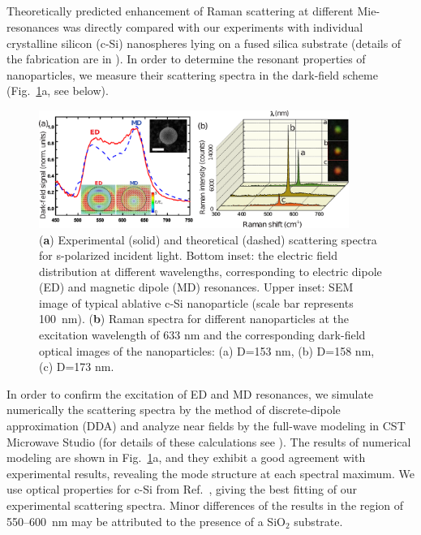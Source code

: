     \subsection{}
        \label{sec:RamanExp}
        Theoretically predicted enhancement of Raman scattering at different Mie-resonances was directly compared with our
        experiments with individual crystalline silicon (c-Si) nanospheres lying on a fused silica substrate (details of the
        fabrication are in ). In order to determine the resonant properties of nanoparticles, we measure
        their scattering spectra in the dark-field scheme (Fig.~\ref{fig:EnhancementExp}a, see  below).

        \begin{figure}[!ht]
            \begin{center}
                \includegraphics[width=0.9\textwidth]{figs/results/enhance/EnhancementExperiment.eps}
            \end{center}
            \caption{(\textbf{a}) Experimental (solid) and theoretical (dashed) scattering spectra for s-polarized incident light.
            Bottom inset: the electric field distribution at different wavelengths, corresponding to electric dipole (ED) and magnetic
            dipole (MD) resonances. Upper inset: SEM image of typical ablative c-Si nanoparticle (scale bar represents 100~nm). (\textbf{b})
            Raman spectra for different nanoparticles at the excitation wavelength of 633 nm and the corresponding dark-field optical images of the
            nanoparticles: (a) D=153 nm, (b) D=158 nm, (c) D=173 nm.}
            \label{fig:EnhancementExp}
        \end{figure}

        In order to confirm the excitation of ED and MD resonances, we simulate numerically the scattering spectra by the method of
        discrete-dipole approximation (DDA) and analyze near fields by the full-wave modeling in CST Microwave Studio (for details of
        these calculations see ). The results of numerical modeling are shown in Fig.~\ref{fig:EnhancementExp}a, and they exhibit a
        good agreement with experimental results, revealing the mode structure at each spectral maximum. We use optical properties for
        c-Si from Ref.~\cite{vuye1993temperature}, giving the best fitting of our experimental scattering spectra. Minor differences of the results in
        the region of 550--600~nm may be attributed to the presence of a SiO$_2$ substrate.

